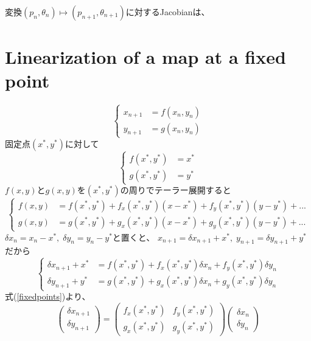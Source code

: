 \documentclass[]{jlreq}
\begin{document}
変換$(p_n, \theta_n)\mapsto (p_{n+1}, \theta_{n+1})$に対するJacobianは、

\section{Linearization of a map at a fixed point}
%
\begin{equation}
    \left\{
    \begin{aligned}
        x_{n+1} &= f(x_n, y_n) \\
        y_{n+1} &= g(x_n, y_n)
        \label{map1}
    \end{aligned}
    \right.
\end{equation}
%
固定点$(x^*,y^*)$に対して
%
\begin{equation}
    \left\{
    \begin{aligned}
        f(x^*, y^*) &= x^* \\
        g(x^*, y^*) &= y^*
        \label{fixedpoints}
    \end{aligned}
    \right.
\end{equation}
%
$f(x,y)$と$g(x,y)$を$(x^*,y^*)$の周りでテーラー展開すると
%
\begin{equation}
    \left\{
    \begin{aligned}
        f(x,y) &= f(x^*, y^*) +f_x(x^*,y^*)(x-x^*)+f_y(x^*,y^*)(y-y^*)+ ... \\
        g(x,y) &= g(x^*, y^*) +g_x(x^*,y^*)(x-x^*)+g_y(x^*,y^*)(y-y^*)+ ...
    \end{aligned}
    \right.
\end{equation}
%
$\delta x_n = x_n - x^*,\; \delta y_n = y_n - y^*$と置くと、
$x_{n+1} = \delta x_{n+1} + x^*,\; y_{n+1} = \delta y_{n+1}+y^*$だから
%
\begin{equation}
    \left\{
    \begin{aligned}
        \delta x_{n+1} + x^* &= f(x^*, y^*) +f_x(x^*,y^*)\delta x_n+f_y(x^*,y^*)\delta y_n \\
        \delta y_{n+1} + y^* &= g(x^*, y^*) +g_x(x^*,y^*)\delta x_n + g_y(x^*,y^*)\delta y_n
    \end{aligned}
    \right.
\end{equation}
%
式(\ref{fixedpoints})より、
%
\begin{equation}
    \begin{pmatrix}
        \delta x_{n+1}\\
        \delta y_{n+1}
    \end{pmatrix}
    =
    \begin{pmatrix}
        f_x(x^*,y^*) & f_y(x^*,y^*)\\
        g_x(x^*,y^*) & g_y(x^*,y^*)
    \end{pmatrix}
    \begin{pmatrix}
        \delta x_n \\
        \delta y_n
    \end{pmatrix}
\end{equation}
\end{document}
